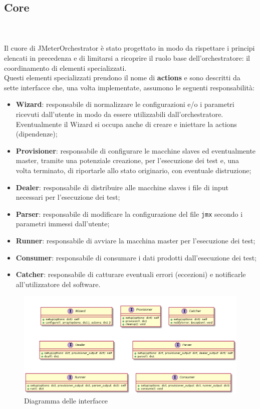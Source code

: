 \subsection{Core}
\\\\
Il cuore di JMeterOrchestrator è stato progettato in modo da rispettare i principi elencati in precedenza e di limitarsi a ricoprire il ruolo base dell'orchestratore: il coordinamento di elementi specializzati. \\
Questi elementi specializzati prendono il nome di \textbf{actions} e sono descritti da sette interfacce che, una volta implementate, assumono le seguenti responsabilità:
\begin{itemize}
	\item \textbf{Wizard}: responsabile di normalizzare le configurazioni e/o i parametri ricevuti dall'utente in modo da essere utilizzabili dall'orchestratore. Eventualmente il Wizard si occupa anche di creare e iniettare la actions (dipendenze);
	\item \textbf{Provisioner}: responsabile di configurare le macchine slaves ed eventualmente master, tramite una potenziale creazione, per l'esecuzione dei test e, una volta terminato, di riportarle allo stato originario, con eventuale distruzione;
	\item \textbf{Dealer}: responsabile di distribuire alle macchine slaves i file di input necessari per l'esecuzione dei test;
	\item \textbf{Parser}: responsabile di modificare la configurazione del file \texttt{jmx} secondo i parametri immessi dall'utente;
	\item \textbf{Runner}: responsabile di avviare la macchina master per l'esecuzione dei test;
	\item \textbf{Consumer}: responsabile di consumare i dati prodotti dall'esecuzione dei test;
	\item \textbf{Catcher}: responsabile di catturare eventuali errori (eccezioni) e notificarle all'utilizzatore del software.
\end{itemize} 
\begin{figure}[H]
	\centering
	\includegraphics[width=13cm]{immagini/interfaces}
	\caption{Diagramma delle interfacce}
	\label{img-diagramma-interfacce}
\end{figure}
